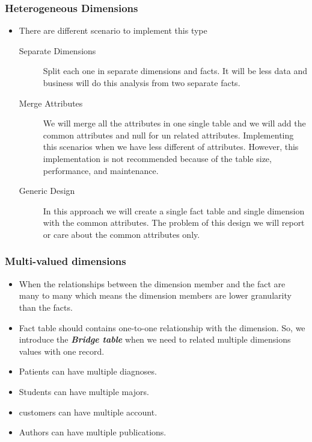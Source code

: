 \begin{frame}
	\frametitle{Heterogeneous Dimensions}
	\begin{itemize}[<+->]		
		\item There are different scenario to implement this type
		\begin{description}
			\item [Separate Dimensions] Split each one in separate dimensions and facts. It will be less data and business will do this analysis from two separate facts.
			\item [Merge Attributes] We will merge all the attributes in one single table and we will add the common attributes and null for un related attributes. Implementing this scenarios when we have less different of attributes. However, this implementation is not recommended because of the table size, performance, and maintenance.
			\item [Generic Design] In this approach we will create a single fact table and single dimension with the common attributes. The problem of this design we will report or care about the common attributes only.
		\end{description}		
\end{itemize}
\end{frame}
\VideoClassification[column=1, colour=blue]
\begin{frame}
\frametitle{Multi-valued dimensions}
\begin{itemize}[<+->]
	\item When the relationships between the dimension member and the fact are many to many which means the dimension members are lower granularity than the facts. 
	\item Fact table should contains one-to-one relationship with the dimension. So, we introduce the \textbf{\textit{Bridge table}} when we need to related multiple dimensions values with one record.
\end{itemize}

\begin{example}
	\begin{itemize}[<+->]
		\item Patients can have multiple diagnoses.
		\item Students can have multiple majors.
		\item customers can have multiple account.
		\item Authors can have multiple publications.
	\end{itemize}
\end{example}		

\end{frame}
